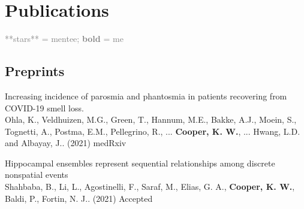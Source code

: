 \documentclass[10pt]{cooperCV2}
\begin{document}
\needspace{\headerpush}
\section{Publications}
\textcolor{grey}{**stars** = mentee; \textbf{bold} = me}\\

 
 
	

\subsection{Preprints} 
\begin{etaremune}[itemindent=-1.5\bibhang, topsep=0pt,
				   itemsep=\bibsep,partopsep=0pt,parsep=0pt,leftmargin={\bibhang+\widthof{[999]}}] 
    
    \item Increasing incidence of parosmia and phantosmia in patients recovering from COVID-19 smell loss. \\
     Ohla, K., Veldhuizen, M.G., Green, T., Hannum, M.E., Bakke, A.J., Moein, S., Tognetti, A., Postma, E.M., Pellegrino, R., ... \textbf{Cooper, K. W.}, ... Hwang, L.D. and Albayay, J.. (2021) medRxiv 
     
	
    \item Hippocampal ensembles represent sequential relationships among discrete nonspatial events \\
     Shahbaba, B., Li, L., Agostinelli, F., Saraf, M., Elias, G. A., \textbf{Cooper, K. W.}, Baldi, P.,  Fortin, N. J.. (2021) Accepted 
     
	

\end{etaremune}

 

	
\end{document}
